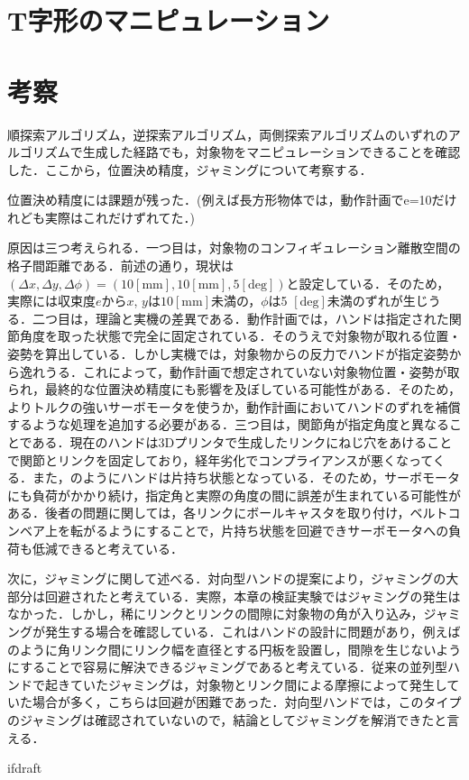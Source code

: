 \documentclass[a4paper,twoside,12pt,papersize, dvipdfmx]{iirthesis}
\begin{document}
\section{T字形のマニピュレーション}

\section{考察} \label{sec::result::consideration}
順探索アルゴリズム，逆探索アルゴリズム，両側探索アルゴリズムのいずれのアルゴリズムで生成した経路でも，対象物をマニピュレーションできることを確認した．ここから，位置決め精度，ジャミングについて考察する．\par
位置決め精度には課題が残った．(例えば長方形物体では，動作計画でe=10だけれども実際はこれだけずれてた．)\par
原因は三つ考えられる．一つ目は，対象物のコンフィギュレーション離散空間の格子間距離である．前述の通り，現状は$(\Delta x, \Delta y, \Delta \phi) = (10 \mathrm{[mm]}, 10 \mathrm{[mm]}, 5 \mathrm{[deg]})$と設定している．そのため，実際には収束度$e$から$x$, $y$は$10 \mathrm{[mm]}$未満の，$\phi$は5 $\mathrm{[deg]}$未満のずれが生じうる．二つ目は，理論と実機の差異である．動作計画では，ハンドは指定された関節角度を取った状態で完全に固定されている．そのうえで対象物が取れる位置・姿勢を算出している．しかし実機では，対象物からの反力でハンドが指定姿勢から逸れうる．これによって，動作計画で想定されていない対象物位置・姿勢が取られ，最終的な位置決め精度にも影響を及ぼしている可能性がある．そのため，よりトルクの強いサーボモータを使うか，動作計画においてハンドのずれを補償するような処理を追加する必要がある．三つ目は，関節角が指定角度と異なることである．現在のハンドは3Dプリンタで生成したリンクにねじ穴をあけることで関節とリンクを固定しており，経年劣化でコンプライアンスが悪くなってくる．また，\figref{}のようにハンドは片持ち状態となっている．そのため，サーボモータにも負荷がかかり続け，指定角と実際の角度の間に誤差が生まれている可能性がある．後者の問題に関しては，各リンクにボールキャスタを取り付け，ベルトコンベア上を転がるようにすることで，片持ち状態を回避できサーボモータへの負荷も低減できると考えている．\par

次に，ジャミングに関して述べる．対向型ハンドの提案により，ジャミングの大部分は回避されたと考えている．実際，本章の検証実験ではジャミングの発生はなかった．しかし，稀にリンクとリンクの間隙に対象物の角が入り込み，ジャミングが発生する場合を確認している．これはハンドの設計に問題があり，例えば\figref{}のように角リンク間にリンク幅を直径とする円板を設置し，間隙を生じないようにすることで容易に解決できるジャミングであると考えている．従来の並列型ハンドで起きていたジャミングは，対象物とリンク間による摩擦によって発生していた場合が多く，こちらは回避が困難であった．対向型ハンドでは，このタイプのジャミングは確認されていないので，結論としてジャミングを解消できたと言える．




\expandafter\ifx\csname ifdraft\endcsname\relax
    
\end{document}
